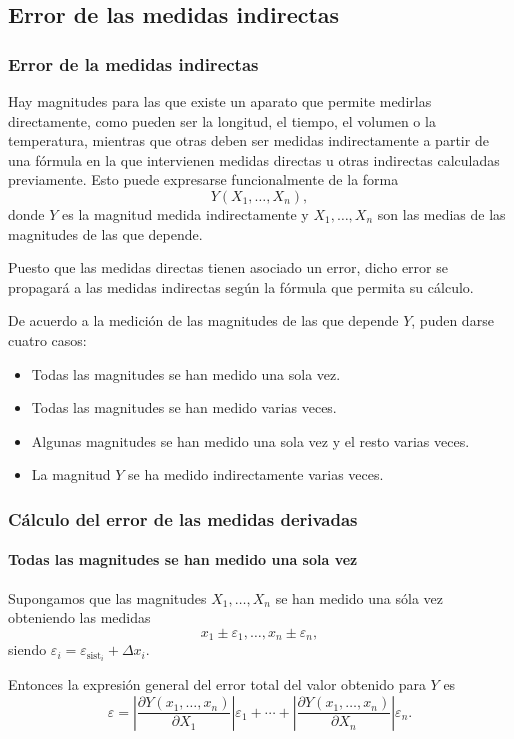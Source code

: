 \subsection{Error de las medidas indirectas}
\begin{frame}
\frametitle{Error de la medidas indirectas}
Hay magnitudes para las que existe un aparato que permite medirlas directamente, como pueden ser la longitud, el
tiempo, el volumen o la temperatura, mientras que otras deben ser medidas indirectamente a partir de una fórmula en la
que intervienen medidas directas u otras indirectas calculadas previamente. Esto puede expresarse funcionalmente de la forma
\[Y(X_1,\ldots,X_n),\]
donde $Y$ es la magnitud medida indirectamente y $X_1,\ldots,X_n$ son las medias de las magnitudes de las que depende. 

Puesto que las medidas directas tienen asociado un error, dicho error se propagará a las medidas indirectas según la
fórmula que permita su cálculo.

De acuerdo a la medición de las magnitudes de las que depende $Y$, puden darse cuatro casos:
\begin{itemize}
\item Todas las magnitudes se han medido una sola vez.
\item Todas las magnitudes se han medido varias veces.
\item Algunas magnitudes se han medido una sola vez y el resto varias veces.
\item La magnitud $Y$ se ha medido indirectamente varias veces.
\end{itemize}
\end{frame}


\begin{frame}
\frametitle{Cálculo del error de las medidas derivadas}
\framesubtitle{Todas las magnitudes se han medido una sola vez}
Supongamos que las magnitudes $X_1,\ldots,X_n$ se han medido una sóla vez obteniendo las medidas
\[
x_1\pm \varepsilon_1,\ldots, x_n\pm\varepsilon_n,
\] 
siendo $\varepsilon_i=\varepsilon_{\textrm{sist}_i}+\Delta x_i$.

Entonces la expresión general del error total del valor obtenido para $Y$ es
\[
\varepsilon=\left|\frac{\partial Y(x_1,\ldots,x_n)}{\partial X_1}\right|\varepsilon_1+\cdots+\left|\frac{\partial
Y(x_1,\ldots,x_n)}{\partial X_n}\right|\varepsilon_n.
\]
\end{frame}


